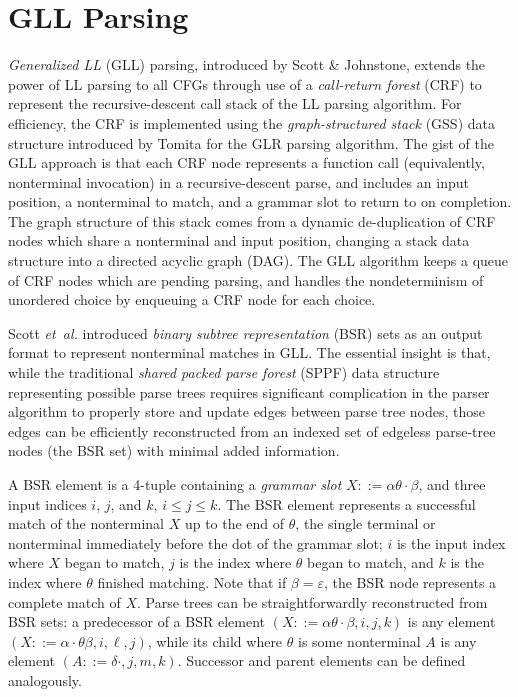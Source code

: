 \documentclass{article}
\makeatletter
\newcommand{\etal}{\textit{et~al.}\@}
\makeatother
\begin{document}
\section{GLL Parsing}
\emph{Generalized LL} (GLL) parsing, introduced by Scott \& Johnstone\cite{SJ10,SJvB19}, extends the power of LL parsing to all CFGs through use of a \emph{call-return forest} (CRF) to represent the recursive-descent call stack of the LL parsing algorithm. 
For efficiency, the CRF is implemented using the \emph{graph-structured stack} (GSS) data structure introduced by Tomita\cite{Tom85} for the GLR parsing algorithm. 
The gist of the GLL approach is that each CRF node represents a function call (equivalently, nonterminal invocation) in a recursive-descent parse, and includes an input position, a nonterminal to match, and a grammar slot to return to on completion. 
The graph structure of this stack comes from a dynamic de-duplication of CRF nodes which share a nonterminal and input position, changing a stack data structure into a directed acyclic graph (DAG). 
The GLL algorithm keeps a queue of CRF nodes which are pending parsing, and handles the nondeterminism of unordered choice by enqueuing a CRF node for each choice.

Scott \etal\cite{SJvB19} introduced \emph{binary subtree representation} (BSR) sets as an output format to represent nonterminal matches in GLL. 
The essential insight is that, while the traditional \emph{shared packed parse forest} (SPPF)\cite{Tom85} data structure representing possible parse trees requires significant complication in the parser algorithm to properly store and update edges between parse tree nodes, those edges can be efficiently reconstructed from an indexed set of edgeless parse-tree nodes (the BSR set) with minimal added information. 

A BSR element is a 4-tuple containing a \emph{grammar slot} $X ::= \alpha\theta\cdot\beta$, and three input indices $i$, $j$, and $k$, $i \leq j \leq k$. 
The BSR element represents a successful match of the nonterminal $X$ up to the end of $\theta$, the single terminal or nonterminal immediately before the dot of the grammar slot; $i$ is the input index where $X$ began to match, $j$ is the index where $\theta$ began to match, and $k$ is the index where $\theta$ finished matching. 
Note that if $\beta = \varepsilon$, the BSR node represents a complete match of $X$.
Parse trees can be straightforwardly reconstructed from BSR sets: a predecessor of a BSR element $(X ::= \alpha\theta\cdot\beta, i, j, k)$ is any element $(X ::= \alpha\cdot\theta\beta, i, \ell, j)$, while its child where $\theta$ is some nonterminal $A$ is any element $(A ::= \delta\cdot, j, m, k)$. Successor and parent elements can be defined analogously.
\end{document}
